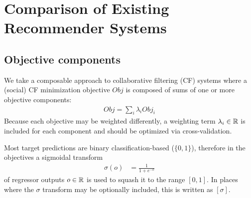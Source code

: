 \chapter{Comparison of Existing Recommender Systems}

\section{Objective components}

We take a composable approach to collaborative filtering (CF) systems
where a (social) CF minimization 
objective $\mathit{Obj}$ is composed of sums of one or more
objective components:
\begin{align}
\mathit{Obj} = \sum_i \lambda_i \mathit{Obj}_i
\end{align}
Because each objective may be weighted differently, a 
weighting term $\lambda_i \in \mathbb{R}$ is included for each component and should be
optimized via cross-validation.

Most target predictions are binary 
classification-based ($\{0,1\}$), therefore
in the objectives a sigmoidal transform 
\begin{align}
\sigma(o) & = \frac{1}{1 + e^{-o}}
\end{align}
of regressor outputs $o \in \mathbb{R}$ is used to squash it 
to the range $[0, 1]$.  
In places where the $\sigma$ transform may be optionally included, 
this is written as $[\sigma]$.  

